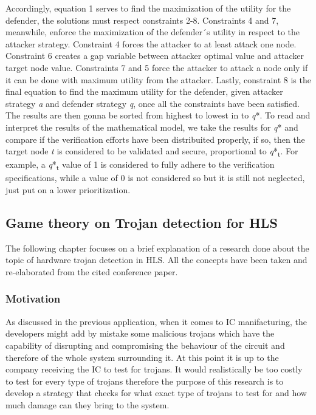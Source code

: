 \documentclass[conference]{IEEEtran}
\begin{document}
Accordingly, equation 1 serves to find the maximization of the utility for the defender, the solutions must respect constraints 2-8. 
Constraints 4 and 7, meanwhile, enforce the maximization of the defender´s utility in respect to the attacker strategy. Constraint 4 forces the attacker to at least attack one node. Constraint 6 creates a gap variable between attacker optimal value and attacker target node value. Constraints 7 and 5 force the attacker to attack a node only if it can be done with maximum utility from the attacker. Lastly, constraint 8 is the final equation to find the maximum utility for the defender, given attacker strategy \textit{a} and defender strategy \textit{q}, once all the constraints have been satisfied. The results are then gonna be sorted from highest to lowest in to \textit{q}*.
To read and interpret the results of the mathematical model, we take the results for \textit{q}* and compare if the verification efforts have been distribuited properly, if so, then the target node \textit{t} is considered to be validated and secure, proportional to \textit{q}*\textsubscript{t}. For example, a \textit{q}*\textsubscript{t} value of 1 is considered to fully adhere to the verification specifications, while a value of 0 is not considered so but it is still not neglected, just put on a lower prioritization.\\


\subsection{Game theory on Trojan detection for HLS}
The following chapter focuses on a brief explanation of a research done about the topic of hardware trojan detection in HLS. All the concepts have been taken and re-elaborated from the cited conference paper. \cite{b10}
\subsubsection{Motivation}
As discussed in the previous application, when it comes to IC manifacturing, the developers might add by mistake some malicious trojans which have the capability of disrupting and compromising the behaviour of the circuit and therefore of the whole system surrounding it. At this point it is up to the company receiving the IC to test for trojans. It would realistically be too costly to test for every type of trojans therefore the purpose of this research is to develop a strategy that checks for what exact type of trojans to test for and how much damage can they bring to the system.
\end{document}

